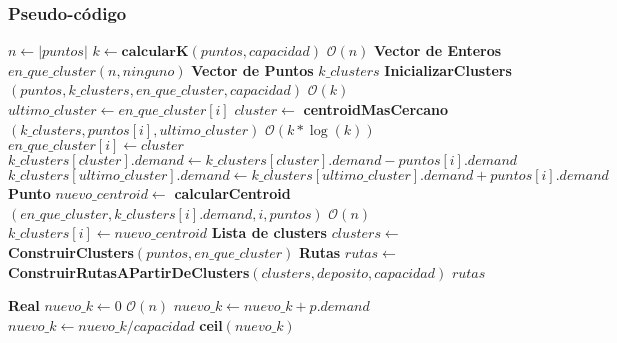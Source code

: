 \subsubsection{Pseudo-código}

\begin{algorithm}[H]
	\caption{\Comment $\mathcal{O}(n*k*\log(k) + k*n) = \mathcal{O}(n*k*\log(k))$}
	\begin{algorithmic}[1]
		\State $n \gets |puntos|$
		\State $k \gets \textbf{calcularK}(puntos, capacidad)$ \Comment $\mathcal{O}(n)$
		\Statex
		\State \textbf{Vector de Enteros} $en\_que\_cluster\mathcal{}(n, ninguno)$
		\State \textbf{Vector de Puntos} $k\_clusters$
		\State \textbf{InicializarClusters}$(puntos, k\_clusters, en\_que\_cluster, capacidad)$  \Comment $\mathcal{O}(k)$
		\Statex
		\State $ultimo\_cluster \gets en\_que\_cluster[i]$
		\State $cluster \gets $ \textbf{centroidMasCercano}$(k\_clusters, puntos[i], ultimo\_cluster)$ \Comment $\mathcal{O}(k*\log(k))$
		\State $en\_que\_cluster[i] \gets cluster$
		\State $k\_clusters[cluster].demand \gets k\_clusters[cluster].demand-puntos[i].demand$
		\State $k\_clusters[ultimo\_cluster].demand \gets k\_clusters[ultimo\_cluster].demand + puntos[i].demand$
		\EndIf
		\EndIf
		\EndFor
		\State \textbf{Punto } $nuevo\_centroid \gets $ \textbf{calcularCentroid}$(en\_que\_cluster, k\_clusters[i].demand, i, puntos)$ \Comment $\mathcal{O}(n)$
		\State $k\_clusters[i] \gets nuevo\_centroid$
		\EndIf
		\EndFor
		\EndWhile
		\Statex
		\State 
		\State \textbf{Lista de clusters} $clusters \gets $ \textbf{ConstruirClusters}$(puntos, en\_que\_cluster)$
		\State \textbf{Rutas} $rutas \gets$ \textbf{ConstruirRutasAPartirDeClusters}$(clusters, deposito, capacidad)$
		\Statex
		\State \Return $rutas$
		\EndFunction
	\end{algorithmic}
\end{algorithm}


\begin{algorithm}[H]
	\caption{\Comment $\mathcal{O}(n)$}
	\label{calcular-k}
	\begin{algorithmic}[1]
		\State \textbf{Real } $nuevo\_k \gets 0$
		 \Comment $\mathcal{O}(n)$
		\State $nuevo\_k \gets nuevo\_k + p.demand$
		\EndFor
		\State $nuevo\_k \gets nuevo\_k/capacidad$ 
		\State \Return \textbf{ceil}$(nuevo\_k)$
		\EndFunction
	\end{algorithmic}
\end{algorithm}

